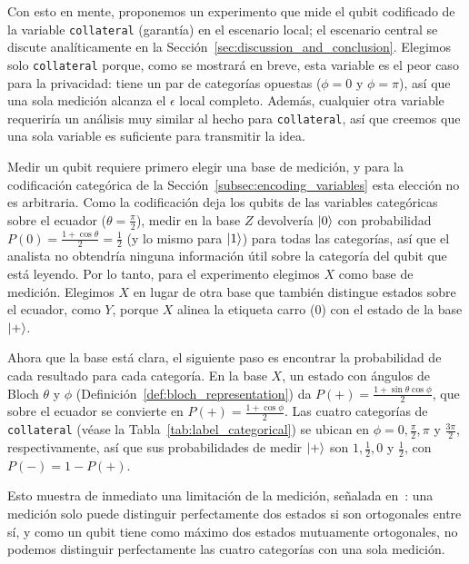 \documentclass{ieeeaccess}
\begin{document}
Con esto en mente, proponemos un experimento que mide el qubit codificado de la variable \texttt{collateral} (garantía) en el escenario local; el escenario central se discute analíticamente en la Sección~\ref{sec:discussion_and_conclusion}. Elegimos solo \texttt{collateral} porque, como se mostrará en breve, esta variable es el peor caso para la privacidad: tiene un par de categorías opuestas ($\phi = 0$ y $\phi = \pi$), así que una sola medición alcanza el $\epsilon$ local completo. Además, cualquier otra variable requeriría un análisis muy similar al hecho para \texttt{collateral}, así que creemos que una sola variable es suficiente para transmitir la idea.

Medir un qubit requiere primero elegir una base de medición, y para la codificación categórica de la Sección~\ref{subsec:encoding_variables} esta elección no es arbitraria. Como la codificación deja los qubits de las variables categóricas sobre el ecuador ($\theta = \frac{\pi}{2}$), medir en la base $Z$ devolvería $\ket{0}$ con probabilidad $P(0) = \frac{1 + \cos\theta}{2} = \frac{1}{2}$ (y lo mismo para $\ket{1}$) para todas las categorías, así que el analista no obtendría ninguna información útil sobre la categoría del qubit que está leyendo. Por lo tanto, para el experimento elegimos $X$ como base de medición. Elegimos $X$ en lugar de otra base que también distingue estados sobre el ecuador, como $Y$, porque $X$ alinea la etiqueta carro (0) con el estado de la base $\ket{+}$.

Ahora que la base está clara, el siguiente paso es encontrar la probabilidad de cada resultado para cada categoría. En la base $X$, un estado con ángulos de Bloch $\theta$ y $\phi$ (Definición~\ref{def:bloch_representation}) da $P(+) = \frac{1 + \sin\theta\cos\phi}{2}$, que sobre el ecuador se convierte en $P(+) = \frac{1 + \cos\phi}{2}$. Las cuatro categorías de \texttt{collateral} (véase la Tabla~\ref{tab:label_categorical}) se ubican en $\phi = 0, \frac{\pi}{2}, \pi$ y $\frac{3\pi}{2}$, respectivamente, así que sus probabilidades de medir $\ket{+}$ son $1, \frac{1}{2}, 0$ y $\frac{1}{2}$, con $P(-) = 1 - P(+)$.

Esto muestra de inmediato una limitación de la medición, señalada en~\cite{watrous_limitations}: una medición solo puede distinguir perfectamente dos estados si son ortogonales entre sí, y como un qubit tiene como máximo dos estados mutuamente ortogonales, no podemos distinguir perfectamente las cuatro categorías con una sola medición.
\end{document}
